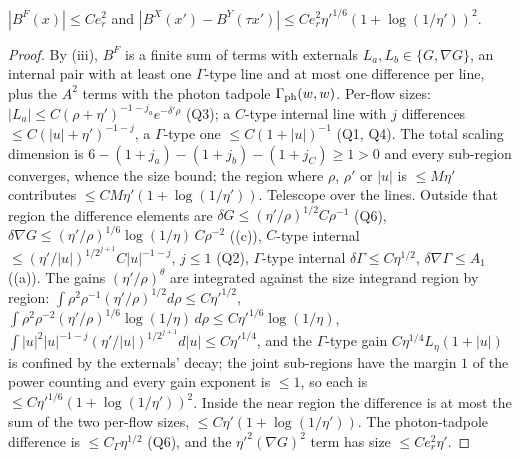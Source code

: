 \begin{lemma}\label{rot:lem:CK7}
$|B^F(x)|\le Ce_r^2$ and $|B^X(x')-B^Y(\tau x')|\le Ce_r^2\eta'^{1/6}(1+\log(1/\eta'))^2$.
\end{lemma}
\begin{proof}
By (iii), $B^F$ is a finite sum of terms with externals $L_a,L_b\in\{G,\nabla G\}$, an internal pair with at least one $\Gamma$-type line and at most one difference per line, plus the $A^2$ terms with the photon tadpole $\Gamma_{\rm ph}(w,w)$. Per-flow sizes: $|L_a|\le C(\rho+\eta')^{-1-j_a}e^{-\delta'\rho}$ (Q3); a $C$-type internal line with $j$ differences $\le C(|u|+\eta')^{-1-j}$, a $\Gamma$-type one $\le C(1+|u|)^{-1}$ (Q1, Q4). The total scaling dimension is $6-(1+j_a)-(1+j_b)-(1+j_C)\ge1>0$ and every sub-region converges, whence the size bound; the region where $\rho$, $\rho'$ or $|u|$ is $\le M\eta'$ contributes $\le CM\eta'(1+\log(1/\eta'))$. Telescope over the lines. Outside that region the difference elements are $\delta G\le(\eta'/\rho)^{1/2}C\rho^{-1}$ (Q6), $\delta\nabla G\le(\eta'/\rho)^{1/6}\log(1/\eta)\,C\rho^{-2}$ ((c)), $C$-type internal $\le(\eta'/|u|)^{1/2^{j+1}}C|u|^{-1-j}$, $j\le1$ (Q2), $\Gamma$-type internal $\delta\Gamma\le C\eta^{1/2}$, $\delta\nabla\Gamma\le A_1$ ((a)). The gains $(\eta'/\rho)^\theta$ are integrated against the size integrand region by region: $\int\rho^2\rho^{-1}(\eta'/\rho)^{1/2}d\rho\le C\eta'^{1/2}$, $\int\rho^2\rho^{-2}(\eta'/\rho)^{1/6}\log(1/\eta)\,d\rho\le C\eta'^{1/6}\log(1/\eta)$, $\int|u|^2|u|^{-1-j}(\eta'/|u|)^{1/2^{j+1}}d|u|\le C\eta'^{1/4}$, and the $\Gamma$-type gain $C\eta^{1/4}L_\eta(1+|u|)$ is confined by the externals' decay; the joint sub-regions have the margin $1$ of the power counting and every gain exponent is $\le1$, so each is $\le C\eta'^{1/6}(1+\log(1/\eta'))^2$. Inside the near region the difference is at most the sum of the two per-flow sizes, $\le C\eta'(1+\log(1/\eta'))$. The photon-tadpole difference is $\le C_\Gamma\eta^{1/2}$ (Q6), and the $\eta'^2(\nabla G)^2$ term has size $\le Ce_r^2\eta'$.
\end{proof}

